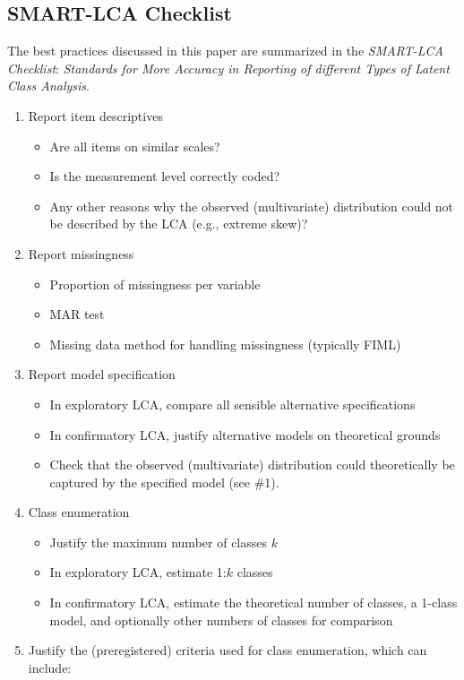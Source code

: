 \documentclass[
  ,man,floatsintext]{apa6}
\providecommand{\tightlist}{%
  \setlength{\itemsep}{0pt}\setlength{\parskip}{0pt}}
\begin{document}
\hypertarget{smart-lca-checklist}{%
\subsection{SMART-LCA Checklist}\label{smart-lca-checklist}}

The best practices discussed in this paper are summarized in the \emph{SMART-LCA Checklist}: \emph{Standards for More Accuracy in Reporting of different Types of Latent Class Analysis}.

\begin{enumerate}
\def\labelenumi{\arabic{enumi}.}
\tightlist
\item
  Report item descriptives

  \begin{itemize}
  \tightlist
  \item
    Are all items on similar scales?
  \item
    Is the measurement level correctly coded?
  \item
    Any other reasons why the observed (multivariate) distribution could not be described by the LCA (e.g., extreme skew)?
  \end{itemize}
\item
  Report missingness

  \begin{itemize}
  \tightlist
  \item
    Proportion of missingness per variable
  \item
    MAR test
  \item
    Missing data method for handling missingness (typically FIML)
  \end{itemize}
\item
  Report model specification

  \begin{itemize}
  \tightlist
  \item
    In exploratory LCA, compare all sensible alternative specifications
  \item
    In confirmatory LCA, justify alternative models on theoretical grounds
  \item
    Check that the observed (multivariate) distribution could theoretically be captured by the specified model (see \#1).
  \end{itemize}
\item
  Class enumeration

  \begin{itemize}
  \tightlist
  \item
    Justify the maximum number of classes \(k\)
  \item
    In exploratory LCA, estimate 1:\(k\) classes
  \item
    In confirmatory LCA, estimate the theoretical number of classes, a 1-class model, and optionally other numbers of classes for comparison
  \end{itemize}
\item
  Justify the (preregistered) criteria used for class enumeration, which can include:


\end{enumerate}
\end{document}
